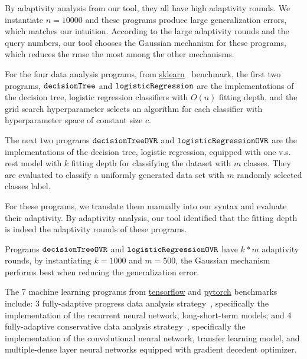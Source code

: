 
By adaptivity analysis from our tool, they all have high adaptivity rounds.
We instantiate $n = 10000$ and these programs produce large generalization errors, which matches our intuition.
According to the large adaptivity rounds and the query numbers, our tool chooses the Gaussian mechanism for these programs, which reduces the rmse the most
among the other mechanisms.


For the four data analysis programs, 
from \hyperlink{https://github.com/scikit-learn/scikit-learn/tree/main/examples}{sklearn}~\cite{SklearnBenchmark} benchmark,
the first two programs, $\mathtt{decisionTree}$ and $\mathtt{logisticRegression}$ are
the
implementations of the decision tree, logistic regression classifiers
with $O(n)$ fitting depth,
and the grid search hyperparameter selects an algorithm for each classifier with 
hyperparameter space of constant size $c$.

The next two programs $\mathtt{decisionTreeOVR}$ and $\mathtt{logisticRegressionOVR}$ are
the implementations of the decision tree, logistic regression, equipped with one v.s. rest model with $k$ fitting depth for classifying the dataset with $m$ classes.
They are evaluated to classify a uniformly generated data set with $m$ randomly selected classes label.

For these programs, we translate them manually into our syntax and evaluate their adaptivity.
By adaptivity analysis, our tool identified that the fitting depth is indeed the adaptivity rounds of these programs.

Programs $\mathtt{decisionTreeOVR}$ and $\mathtt{logisticRegressionOVR}$ 
have $k*m$ adaptivity rounds, by instantiating $k = 1000$ and $m = 500$,
the Gaussian mechanism performs best when reducing the generalization error.








The 7 machine learning programs
from \hyperlink{https://github.com/tensorflow/tensorflow/tree/master/tensorflow/examples}{tensorflow}
and \hyperlink{https://github.com/pytorch/pytorch}{pytorch}
benchmarks include:
3 fully-adaptive progress data analysis
strategy~\cite{ZrnicH19},
specifically the implementation of the recurrent neural network, long-short-term models;
and 4
fully-adaptive conservative data analysis
strategy~\cite{ZrnicH19},
specifically the implementation of the convolutional neural network, transfer learning model,
and multiple-dense layer neural networks equipped with gradient decedent optimizer.

